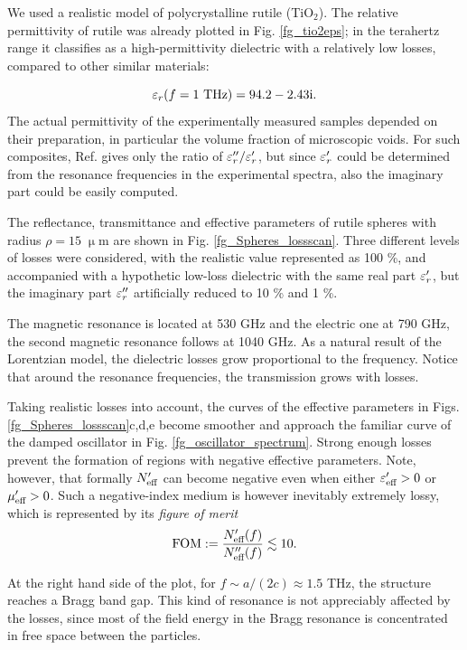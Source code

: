 We used a realistic model \cite{baumard1977_epsilon_TiO2} of polycrystalline rutile (TiO$_{2}$). The relative permittivity of rutile was already plotted in Fig. \ref{fg_tio2eps}; in the terahertz range it classifies as a high-permittivity dielectric with a relatively low losses, compared to other similar materials:

\begin{equation}\varepsilon_r(f=1\text{ THz}) = 94.2-2.43\text{i}. \label{eq_tio2}\end{equation}
The actual permittivity of the experimentally measured samples depended on their preparation, in particular the volume fraction of microscopic voids. For such composites, Ref. \cite{baumard1977_epsilon_TiO2} gives only the ratio of $\varepsilon_r''/\varepsilon_r'$, but since $\varepsilon_r'$ could be determined from the resonance frequencies in the experimental spectra, also the imaginary part could be easily computed.

The reflectance, transmittance and effective parameters of rutile spheres with radius $\rho=15\;\upmu$m are shown in Fig. \ref{fg_Spheres_lossscan}. Three different levels of losses were considered, with the realistic value represented as 100 \%, and accompanied with a hypothetic low-loss dielectric with the same real part $\varepsilon_r'$, but the imaginary part $\varepsilon_r''$ artificially reduced to  10 \% and 1 \%. 

The magnetic resonance is located at 530 GHz and the electric one at 790 GHz, the second magnetic resonance follows at 1040 GHz. As a natural result of the Lorentzian model, the dielectric losses grow proportional to the frequency. Notice that around the resonance frequencies, the transmission grows with losses.

Taking realistic losses into account, the curves of the effective parameters in Figs. \ref{fg_Spheres_lossscan}c,d,e become smoother and approach the familiar curve of the damped oscillator in Fig. \ref{fg_oscillator_spectrum}. Strong enough losses prevent the formation of regions with negative effective parameters. Note, however, that formally $N_{\text{eff} }'$ can become negative \cite[pp. 12--15]{pazoutova2011dp} even when either $\varepsilon_{\text{eff} }'>0$ or $\mu_{\text{eff} }'>0$. Such a negative-index medium is however inevitably extremely lossy, which is represented by its \textit{figure of merit}
\begin{equation} \text{FOM} := \frac{N_{\text{eff} }'(f)}{N_{\text{eff} }''(f)} \lesssim 10. \label{eq_}\end{equation}

At the right hand side of the plot, for $f \sim a/(2c) \approx 1.5$ THz, the structure reaches a Bragg band gap. This kind of resonance is not appreciably affected by the losses, since most of the field energy in the Bragg resonance is concentrated in free space between the particles.

